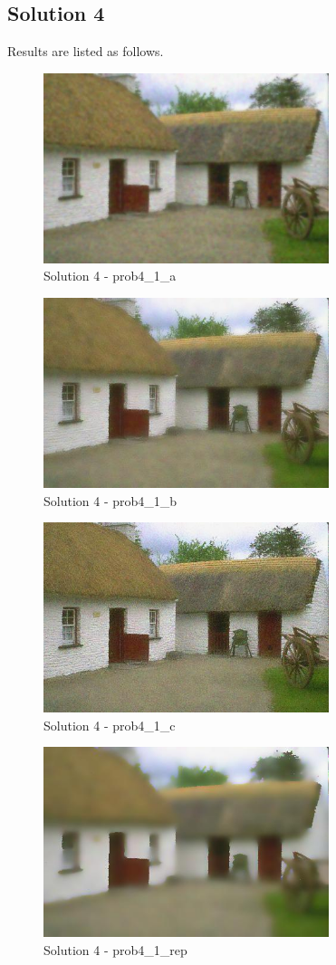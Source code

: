 \documentclass{article}
\newcommand{\solution}[1]{\clearpage \subsection*{Solution #1}}
\begin{document}
\solution{4}
Results are listed as follows.
\begin{figure}[!h]
  \centering
  \includegraphics[height=15em]{"code/outputs/prob4_1_a.jpg"}
  \caption{Solution 4 - prob4\_1\_a}
\end{figure}
\begin{figure}[!h]
  \centering
  \includegraphics[height=15em]{"code/outputs/prob4_1_b.jpg"}
  \caption{Solution 4 - prob4\_1\_b}
\end{figure}
\begin{figure}[!h]
  \centering
  \includegraphics[height=15em]{"code/outputs/prob4_1_c.jpg"}
  \caption{Solution 4 - prob4\_1\_c}
\end{figure}
\begin{figure}[!h]
  \centering
  \includegraphics[height=15em]{"code/outputs/prob4_1_rep.jpg"}
  \caption{Solution 4 - prob4\_1\_rep}
\end{figure}
\end{document}
